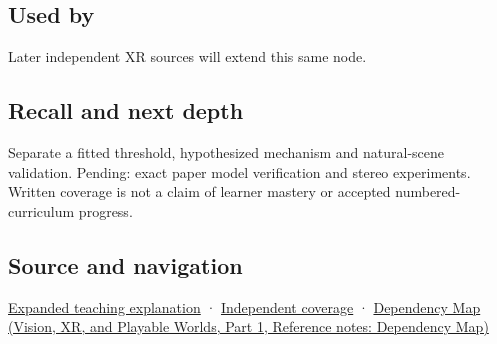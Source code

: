 \subsection{Used by}\label{appendix-8dc848f14052-used-by}

\hypertarget{appendix-8dc848f14052-used-by}{}

Later independent XR sources will extend this same node.

\subsection{Recall and next depth}\label{appendix-8dc848f14052-recall-and-next-depth}

\hypertarget{appendix-8dc848f14052-recall-and-next-depth}{}

Separate a fitted threshold, hypothesized mechanism and natural-scene validation. Pending: exact paper model verification and stereo experiments. Written coverage is not a claim of learner mastery or accepted numbered-curriculum progress.

\subsection{Source and navigation}\label{appendix-8dc848f14052-source-and-navigation}

\hypertarget{appendix-8dc848f14052-source-and-navigation}{}

\hyperref[04-visual-computing-ii-ch042-binocular-depth-changes-the-optimization-question]{Expanded teaching explanation} · \hyperref[appendix-fd090d982a15-xr01---independent-seeing-and-representation-source]{Independent coverage} · \href{../07-Vision-XR-and-Playable-Worlds-P01/main.pdf\#nameddest=appendix-4ad47bdd269a}{Dependency Map (Vision, XR, and Playable Worlds, Part 1, Reference notes: Dependency Map)}
